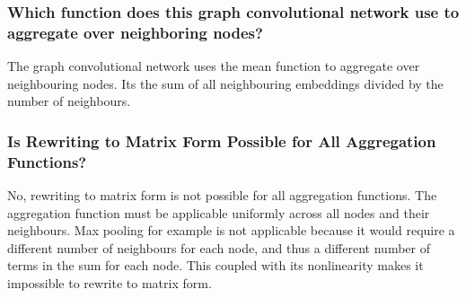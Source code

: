 \documentclass[a4paper]{article}
\begin{document}
\subsubsection{Which function does this graph convolutional network use to aggregate over neighboring nodes?}
The graph convolutional network uses the mean function to aggregate over neighbouring nodes. Its the sum of all
neighbouring embeddings divided by the number of neighbours.

\subsubsection{Is Rewriting to Matrix Form Possible for All Aggregation Functions?}
No, rewriting to matrix form is not possible for all aggregation functions. The aggregation function must be
applicable uniformly across all nodes and their neighbours. Max pooling for example is not applicable because it
would require a different number of neighbours for each node, and thus a different number of terms in the sum for each
node. This coupled with its nonlinearity makes it impossible to rewrite to matrix form.

\bigskip
\end{document}
